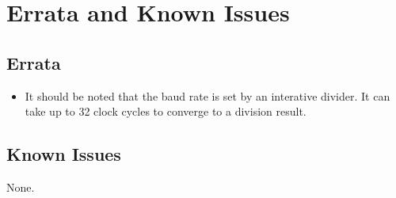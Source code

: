 \section{Errata and Known Issues}

\subsection{Errata}
\begin{itemize}
    \item It should be noted that the baud rate is set by an interative divider. It can take up to 32 clock cycles to converge to a division result.
\end{itemize}

\subsection{Known Issues}
None.